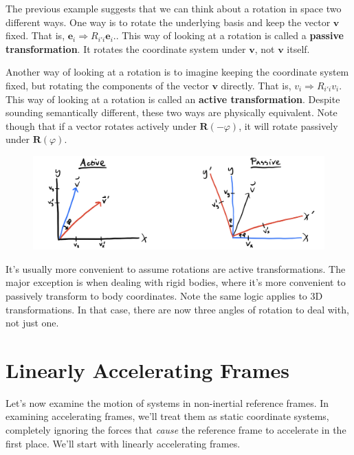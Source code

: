 \documentclass[
  letterpaper,
  DIV=11,
  numbers=noendperiod]{scrreprt}
\begin{document}
The previous example suggests that we can think about a rotation in
space two different ways. One way is to rotate the underlying basis and
keep the vector \(\mathbf{v}\) fixed. That is,
\(\mathbf{e}_i \Rightarrow R_{i'i} \mathbf{e}_i\).. This way of looking
at a rotation is called a \textbf{passive transformation}. It rotates
the coordinate system under \(\mathbf{v}\), not \(\mathbf{v}\) itself.

Another way of looking at a rotation is to imagine keeping the
coordinate system fixed, but rotating the components of the vector
\(\mathbf{v}\) directly. That is, \(v_i \Rightarrow R_{i'i}v_i\). This
way of looking at a rotation is called an \textbf{active
transformation}. Despite sounding semantically different, these two ways
are physically equivalent. Note though that if a vector rotates actively
under \(\mathbf{R}(-\varphi)\), it will rotate passively under
\(\mathbf{R}(\varphi)\).

\begin{figure}

{\centering \includegraphics[width=7.29167in,height=\textheight]{classical-mechanics/./resources/image-20230216112859340.png}

}

\end{figure}

It's usually more convenient to assume rotations are active
transformations. The major exception is when dealing with rigid bodies,
where it's more convenient to passively transform to body coordinates.
Note the same logic applies to 3D transformations. In that case, there
are now three angles of rotation to deal with, not just one.

\hypertarget{linearly-accelerating-frames}{%
\section{Linearly Accelerating
Frames}\label{linearly-accelerating-frames}}

Let's now examine the motion of systems in non-inertial reference
frames. In examining accelerating frames, we'll treat them as static
coordinate systems, completely ignoring the forces that \emph{cause} the
reference frame to accelerate in the first place. We'll start with
linearly accelerating frames.
\end{document}
